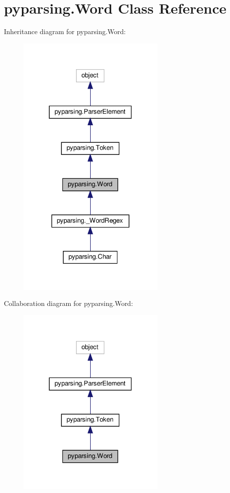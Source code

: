 \hypertarget{classpyparsing_1_1Word}{}\section{pyparsing.\+Word Class Reference}
\label{classpyparsing_1_1Word}


Inheritance diagram for pyparsing.\+Word\+:
\nopagebreak
\begin{figure}[H]
\begin{center}
\leavevmode
\includegraphics[width=206pt]{classpyparsing_1_1Word__inherit__graph}
\end{center}
\end{figure}


Collaboration diagram for pyparsing.\+Word\+:
\nopagebreak
\begin{figure}[H]
\begin{center}
\leavevmode
\includegraphics[width=206pt]{classpyparsing_1_1Word__coll__graph}
\end{center}
\end{figure}
